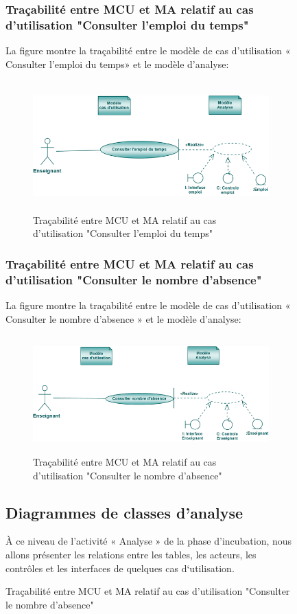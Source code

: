 \documentclass[12 pt]{report}
\begin{document}
\begin{figure}[h]
\begin{center}
\subsubsection{Traçabilité entre MCU et MA relatif au cas d’utilisation "Consulter l'emploi du temps" }
La figure  montre la traçabilité entre le modèle de cas d’utilisation « Consulter l'emploi du temps» et le modèle d’analyse:

\begin{figure}[h]
\begin{center}
\includegraphics[width= 14cm , height =5cm]{cee.png}
\caption{Traçabilité entre MCU et MA relatif au cas d’utilisation "Consulter l'emploi du temps"}
\end{center}
\end{figure}
\subsubsection{Traçabilité entre MCU et MA relatif au cas d’utilisation "Consulter le nombre d'absence" }
La figure  montre la traçabilité entre le modèle de cas d’utilisation « Consulter le nombre d'absence » et le modèle d’analyse:

\begin{figure}[h]
\begin{center}
\includegraphics[width= 14cm , height =4.5cm]{tcna.PNG}
\caption{Traçabilité entre MCU et MA relatif au cas d’utilisation "Consulter le nombre d'absence"}
\end{center}
\end{figure}
\subsection{Diagrammes de classes d'analyse}
 À ce niveau de l’activité « Analyse » de la phase d’incubation, nous allons présenter les relations entre les tables, les acteurs, les contrôles et les interfaces de quelques cas d‘utilisation.


\end{center}
\end{figure}
\end{document}
